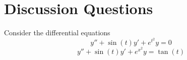 \documentclass[12pt]{amsart}
\begin{document}
\begin{enumerate}
\begin{multicols}{3}
\begin{enumerate}
\end{enumerate}
\end{multicols}
\end{enumerate}

\vfill 


	\section*{Discussion Questions}
	
	
	Consider the differential equations
	\begin{equation}\tag{$\clubsuit$} y'' + \sin(t) y' + e^{t^2} y = 0 \end{equation}
		\begin{equation}\tag{$\diamondsuit$} y'' + \sin(t) y' + e^{x^2} y = \tan(t) \end{equation}
	
	\
	
\end{document}
